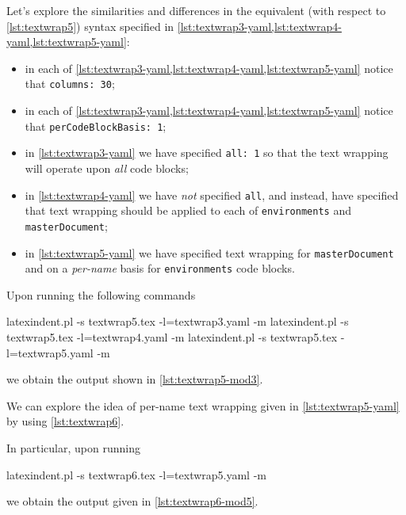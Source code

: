 	Let's explore the similarities and differences in the equivalent (with respect to
	\cref{lst:textwrap5}) syntax specified in \cref{lst:textwrap3-yaml,lst:textwrap4-yaml,lst:textwrap5-yaml}:
	\begin{itemize}
		\item in each of \cref{lst:textwrap3-yaml,lst:textwrap4-yaml,lst:textwrap5-yaml} notice that \texttt{columns: 30};
		\item in each of \cref{lst:textwrap3-yaml,lst:textwrap4-yaml,lst:textwrap5-yaml} notice that \texttt{perCodeBlockBasis: 1};
		\item in \cref{lst:textwrap3-yaml} we have specified \texttt{all: 1} so that the
		      text wrapping will operate upon \emph{all} code blocks;
		\item in \cref{lst:textwrap4-yaml} we have \emph{not} specified
		      \texttt{all}, and instead, have specified that text wrapping should be
		      applied to each of \texttt{environments} and \texttt{masterDocument};
		\item in \cref{lst:textwrap5-yaml} we have specified text wrapping for
		      \texttt{masterDocument} and on a \emph{per-name} basis for
		      \texttt{environments} code blocks.
	\end{itemize}

	Upon running the following commands
	\begin{commandshell}
latexindent.pl -s textwrap5.tex -l=textwrap3.yaml -m
latexindent.pl -s textwrap5.tex -l=textwrap4.yaml -m
latexindent.pl -s textwrap5.tex -l=textwrap5.yaml -m
    \end{commandshell}
	we obtain the output shown in \cref{lst:textwrap5-mod3}.


	We can explore the idea of per-name text wrapping given in \cref{lst:textwrap5-yaml} by
	using \cref{lst:textwrap6}.

	\begin{widepage}
	\end{widepage}

	In particular, upon running
	\begin{commandshell}
latexindent.pl -s textwrap6.tex -l=textwrap5.yaml -m
    \end{commandshell}
	we obtain the output given in \cref{lst:textwrap6-mod5}.

